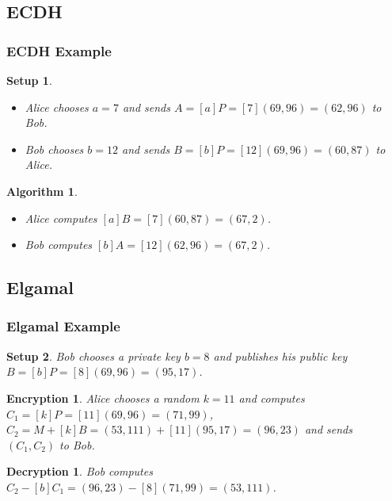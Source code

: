 \documentclass{beamer}
\newtheorem{algorithm}{Algorithm}
\newtheorem{setup}{Setup}
\newtheorem{encryption}{Encryption}
\newtheorem{decryption}{Decryption}
\begin{document}
    \subsection{ECDH}
    \begin{frame}[label=ecdhexample]
        \frametitle{ECDH Example}
        \begin{setup}
            \begin{itemize}
                \item Alice chooses \(a = 7\) and sends \(A = [a]P =
                    [7](69, 96) = (62, 96)\) to Bob.
                \item Bob chooses \(b = 12\) and sends \(B = [b]P =
                    [12](69, 96) = (60, 87)\) to Alice.
            \end{itemize}
        \end{setup}
        \vfill
        \begin{algorithm}
            \begin{itemize}
                \item Alice computes \([a]B = [7](60, 87) = (67, 2)\).
                \item Bob computes \([b]A = [12](62, 96) = (67, 2)\).
            \end{itemize}
        \end{algorithm}
        \hyperlink{ecdh}{}
    \end{frame}

    \subsection{Elgamal}
    \begin{frame}[label=elgamalexample]
        \frametitle{Elgamal Example}
        \begin{setup}
            Bob chooses a private key \(b = 8\) and publishes
            his public key \(B = [b]P = [8](69, 96) = (95, 17)\).
        \end{setup}
        \vfill
        \begin{encryption}
            Alice chooses a random \(k = 11\)
            and computes \(C_1 = [k]P = [11](69, 96) = (71, 99)\),
            \(C_2 = M + [k]B = (53, 111) + [11](95, 17) = (96, 23)\)
            and sends \((C_1, C_2)\) to Bob.
        \end{encryption}
        \vfill
        \begin{decryption}
            Bob computes \(C_2 - [b]C_1 = (96, 23) - [8](71, 99) = (53, 111)\).
        \end{decryption}
        \hyperlink{elgamal}{}
    \end{frame}
\end{document}

